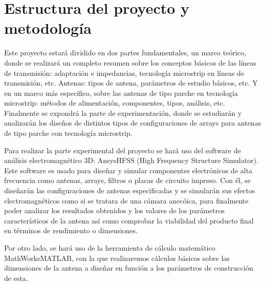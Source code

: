 \section{Estructura del proyecto y metodología}
\label{sec:medodologia}
\par Este proyecto estará dividido en dos partes fundamentales, un marco teórico, donde se realizará un completo resumen sobre los conceptos básicos de las líneas de transmisión: adaptación e impedancias, tecnología microstrip en líneas de transmisión, etc. Antenas: tipos de antena, parámetros de estudio básicos, etc. Y en un marco más específico, sobre las antenas de tipo parche en tecnología microstrip: métodos de alimentación, componentes, tipos, análisis, etc. Finalmente se expondrá la parte de experimentación, donde se estudiarán y analizarán los diseños de distintos tipos de configuraciones de arrays para antenas de tipo parche con tecnología microstrip.
\\
\par Para realizar la parte experimental del proyecto se hará uso del software de análisis electromagnético 3D: Ansys\textregistered HFSS (High Frequency Structure Simulator). Este software es usado para diseñar y simular componentes electrónicos de alta frecuencia como antenas, arrays, filtros o placas de circuito impreso. Con él, se diseñarán las configuraciones de antenas especificadas y se simularán sus efectos electromagnéticos como si se tratara de una cámara anecóica, para finalmente poder analizar los resultados obtenidos y los valores de los parámetros característicos de la antena así como comprobar la viabilidad del producto final en términos de rendimiento o dimensiones.
\\
\par Por otro lado, se hará uso de la herramienta de cálculo matemático MathWorks\textregistered MATLAB, con la que realizaremos cálculos básicos sobre las dimensiones de la antena a diseñar en función a los parámetros de construcción de esta.
